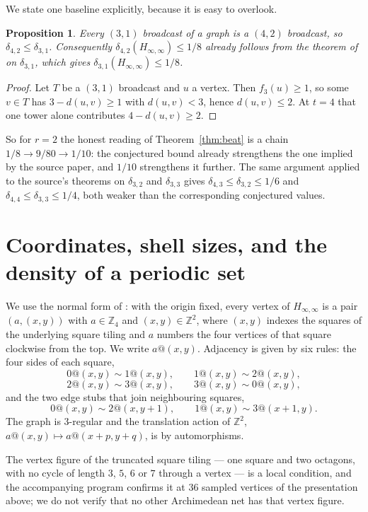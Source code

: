 \documentclass[11pt]{amsart}
\newtheorem{proposition}[theorem]{Proposition}
\theoremstyle{definition}
\begin{document}
We state one baseline explicitly, because it is easy to overlook.

\begin{proposition}\label{prop:baseline}
Every $(3,1)$ broadcast of a graph is a $(4,2)$ broadcast, so
$\delta_{4,2}\leq\delta_{3,1}$. Consequently $\delta_{4,2}(H_{\infty,\infty})\leq 1/8$ already
follows from the theorem of \cite{CervantesHarris} on $\delta_{3,1}$, which gives
$\delta_{3,1}(H_{\infty,\infty})\leq 1/8$.
\end{proposition}

\begin{proof}
Let $T$ be a $(3,1)$ broadcast and $u$ a vertex. Then $f_3(u)\geq 1$, so some $v\in T$ has
$3-d(u,v)\geq 1$ with $d(u,v)<3$, hence $d(u,v)\leq 2$. At $t=4$ that one tower alone
contributes $4-d(u,v)\geq 2$.
\end{proof}

So for $r=2$ the honest reading of Theorem~\ref{thm:beat} is a chain
$1/8\to 9/80\to 1/10$: the conjectured bound already strengthens the one implied by the source
paper, and $1/10$ strengthens it further. The same argument applied to the source's theorems on
$\delta_{3,2}$ and $\delta_{3,3}$ gives $\delta_{4,3}\leq\delta_{3,2}\leq 1/6$ and
$\delta_{4,4}\leq\delta_{3,3}\leq 1/4$, both weaker than the corresponding conjectured values.

\section{Coordinates, shell sizes, and the density of a periodic set}\label{sec:graph}

We use the normal form of \cite{CervantesHarris}: with the origin fixed, every vertex of
$H_{\infty,\infty}$ is a pair $(a,(x,y))$ with $a\in\mathbb{Z}_4$ and $(x,y)\in\mathbb{Z}^2$,
where $(x,y)$ indexes the squares of the underlying square tiling and $a$ numbers the four
vertices of that square clockwise from the top. We write $a@(x,y)$. Adjacency is given by six
rules: the four sides of each square,
\[
  0@(x,y)\sim 1@(x,y),\qquad 1@(x,y)\sim 2@(x,y),
\]
\[
  2@(x,y)\sim 3@(x,y),\qquad 3@(x,y)\sim 0@(x,y),
\]
and the two edge stubs that join neighbouring squares,
\[
  0@(x,y)\sim 2@(x,y+1),\qquad 1@(x,y)\sim 3@(x+1,y).
\]
The graph is $3$-regular and the translation action of $\mathbb{Z}^2$,
$a@(x,y)\mapsto a@(x+p,y+q)$, is by automorphisms.

The vertex figure of the truncated square tiling --- one square and two octagons, with no cycle
of length $3$, $5$, $6$ or $7$ through a vertex --- is a local condition, and the accompanying
program confirms it at $36$ sampled vertices of the presentation above; we do not verify that no
other Archimedean net has that vertex figure.
\end{document}
